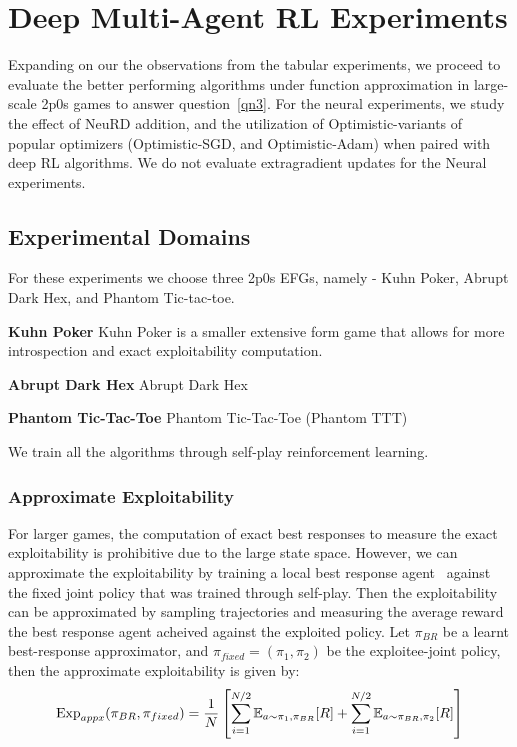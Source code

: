 \chapter{Deep Multi-Agent RL Experiments}
Expanding on our the observations from the tabular experiments, we proceed to evaluate the better
performing algorithms under function approximation in large-scale 2p0s games to answer
question~\ref{qn3}.
For the neural experiments, we study the effect of NeuRD addition, and the utilization of
Optimistic-variants of popular optimizers (Optimistic-SGD, and Optimistic-Adam) when paired with
deep RL algorithms.
We do not evaluate extragradient updates for the Neural experiments.

\section{Experimental Domains}
For these experiments we choose three 2p0s EFGs, namely - Kuhn Poker, Abrupt Dark Hex, and Phantom
Tic-tac-toe.

\textbf{Kuhn Poker}
Kuhn Poker is a smaller extensive form game that allows for more introspection and exact
exploitability computation.

\textbf{Abrupt Dark Hex}
Abrupt Dark Hex

\textbf{Phantom Tic-Tac-Toe} Phantom Tic-Tac-Toe (Phantom TTT)

We train all the algorithms through self-play reinforcement learning.

\subsection{Approximate Exploitability}
For larger games, the computation of exact best responses to measure the exact exploitability is
prohibitive due to the large state space.
However, we can approximate the exploitability by training a local best response
agent~\cite{timbersApproximate2022} against the fixed joint policy that was trained through
self-play.
Then the exploitability can be approximated by sampling trajectories and measuring the average
reward the best response agent acheived against the exploited policy.
Let $\pi_{BR}$ be a learnt best-response approximator, and $\pi_{fixed}=(\pi_1, \pi_2)$ be the
exploitee-joint policy, then the approximate exploitability is given by:
\begin{equation}
	\label{eqn:appxexp} \text{Exp}_{appx} (\pi_{BR}, \pi_{fixed}) = \frac{1}{N} \left[ \sum_{i=1}^{N/2}
		\mathbb{E}_{a \sim \pi_1, \pi_{BR}} [R] + \sum_{i=1}^{N/2} \mathbb{E}_{a \sim \pi_{BR}, \pi_2} [R] \right]
\end{equation} 

